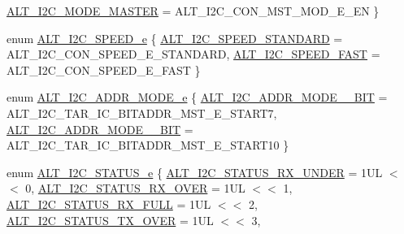 \begin{DoxyCompactItemize}
\mbox{\hyperlink{group__ALT__I2C_ggacf173458ee847bebf75871c319aab2afae4ef988cfcd5b3e534395b11ad7b58cd}{A\+L\+T\+\_\+\+I2\+C\+\_\+\+M\+O\+D\+E\+\_\+\+M\+A\+S\+T\+ER}} = A\+L\+T\+\_\+\+I2\+C\+\_\+\+C\+O\+N\+\_\+\+M\+S\+T\+\_\+\+M\+O\+D\+\_\+\+E\+\_\+\+EN
 \}
\item 
enum \mbox{\hyperlink{group__ALT__I2C_gad65b1b276561735ec5613ae1b1a000b7}{A\+L\+T\+\_\+\+I2\+C\+\_\+\+S\+P\+E\+E\+D\+\_\+e}} \{ \mbox{\hyperlink{group__ALT__I2C_ggad65b1b276561735ec5613ae1b1a000b7a2e0a7aa944c0bafa0f02d474c672a6ab}{A\+L\+T\+\_\+\+I2\+C\+\_\+\+S\+P\+E\+E\+D\+\_\+\+S\+T\+A\+N\+D\+A\+RD}} = A\+L\+T\+\_\+\+I2\+C\+\_\+\+C\+O\+N\+\_\+\+S\+P\+E\+E\+D\+\_\+\+E\+\_\+\+S\+T\+A\+N\+D\+A\+RD, 
\mbox{\hyperlink{group__ALT__I2C_ggad65b1b276561735ec5613ae1b1a000b7a2981a6ba7691f5c26d60a5aa00bf5466}{A\+L\+T\+\_\+\+I2\+C\+\_\+\+S\+P\+E\+E\+D\+\_\+\+F\+A\+ST}} = A\+L\+T\+\_\+\+I2\+C\+\_\+\+C\+O\+N\+\_\+\+S\+P\+E\+E\+D\+\_\+\+E\+\_\+\+F\+A\+ST
 \}
\item 
enum \mbox{\hyperlink{group__ALT__I2C_ga9f24389b4997825c99f8e6f8846be810}{A\+L\+T\+\_\+\+I2\+C\+\_\+\+A\+D\+D\+R\+\_\+\+M\+O\+D\+E\+\_\+e}} \{ \mbox{\hyperlink{group__ALT__I2C_gga9f24389b4997825c99f8e6f8846be810accff0afaa6849f1f5c2bc688b78670db}{A\+L\+T\+\_\+\+I2\+C\+\_\+\+A\+D\+D\+R\+\_\+\+M\+O\+D\+E\+\_\+\_\+\+B\+IT}} = A\+L\+T\+\_\+\+I2\+C\+\_\+\+T\+A\+R\+\_\+\+I\+C\+\_\+B\+I\+T\+A\+D\+D\+R\+\_\+\+M\+S\+T\+\_\+\+E\+\_\+\+S\+T\+A\+R\+T7, 
\mbox{\hyperlink{group__ALT__I2C_gga9f24389b4997825c99f8e6f8846be810a7130f74072ffa24078e96f184689b8f5}{A\+L\+T\+\_\+\+I2\+C\+\_\+\+A\+D\+D\+R\+\_\+\+M\+O\+D\+E\+\_\+\_\+\+B\+IT}} = A\+L\+T\+\_\+\+I2\+C\+\_\+\+T\+A\+R\+\_\+\+I\+C\+\_\+B\+I\+T\+A\+D\+D\+R\+\_\+\+M\+S\+T\+\_\+\+E\+\_\+\+S\+T\+A\+R\+T10
 \}
\item 
enum \mbox{\hyperlink{group__ALT__I2C_ga229c6d995595615ca923ecc8b6490603}{A\+L\+T\+\_\+\+I2\+C\+\_\+\+S\+T\+A\+T\+U\+S\+\_\+e}} \{ \newline
\mbox{\hyperlink{group__ALT__I2C_gga229c6d995595615ca923ecc8b6490603a90ca29e2de258befcec4c4164232a1f1}{A\+L\+T\+\_\+\+I2\+C\+\_\+\+S\+T\+A\+T\+U\+S\+\_\+\+R\+X\+\_\+\+U\+N\+D\+ER}} = 1UL $<$$<$ 0, 
\mbox{\hyperlink{group__ALT__I2C_gga229c6d995595615ca923ecc8b6490603a22b0a9e0ff216b7cded5072d52987070}{A\+L\+T\+\_\+\+I2\+C\+\_\+\+S\+T\+A\+T\+U\+S\+\_\+\+R\+X\+\_\+\+O\+V\+ER}} = 1UL $<$$<$ 1, 
\mbox{\hyperlink{group__ALT__I2C_gga229c6d995595615ca923ecc8b6490603afa25a14f2647196a6d94dfe7f9e9db79}{A\+L\+T\+\_\+\+I2\+C\+\_\+\+S\+T\+A\+T\+U\+S\+\_\+\+R\+X\+\_\+\+F\+U\+LL}} = 1UL $<$$<$ 2, 
\mbox{\hyperlink{group__ALT__I2C_gga229c6d995595615ca923ecc8b6490603a6f17bfac16b8a3b0fdd6702ce70a5434}{A\+L\+T\+\_\+\+I2\+C\+\_\+\+S\+T\+A\+T\+U\+S\+\_\+\+T\+X\+\_\+\+O\+V\+ER}} = 1UL $<$$<$ 3, 

\end{DoxyCompactItemize}
